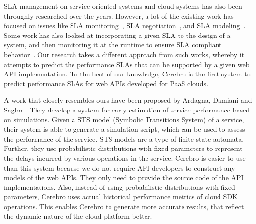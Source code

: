SLA management on service-oriented systems and cloud systems has also been throughly researched
over the years. However, a lot of the existing work has focused on issues like SLA monitoring~\cite{Michlmayr:2009:CQM:1657755.1657756,Tripathy:2011:MMS:1980822.1980832,Raimondi:2008:EOM:1453101.1453125,Bertolino:2007:SUS:1294904.1294914}, SLA negotiation~\cite{Mahbub:2011:PSN:2061042.2062022,Yaqub:2014:ONS:2680847.2681496,6546098}, and SLA modeling~\cite{Chau:2008:ASM:1463788.1463802,Stamou:2013:SGM:2516588.2516592,Skene:2004:PSL:998675.999422}. 
Some work has also looked at incorporating a given SLA to the design of a system, and
then monitoring it at the runtime to ensure SLA compliant behavior~\cite{He:2013:TSC:2532443.2532449}. 
Our research takes a
different approach from such works, whereby it attempts to predict the performance SLAs that can be 
supported by a given web API implementation. To the best of our knowledge, Cerebro is the first system to predict performance SLAs for web APIs developed for PaaS clouds.

A work that closely resembles ours have been proposed by Ardagna, Damiani and Sagbo~\cite{6649675}. They develop
a system for early estimation of service performance based on simulations. Given a STS
model (Symbolic Transitions System) of a service, their system is able to generate a simulation script, which
can be used to assess the performance of the service. STS models are a type of finite state automata. 
Further, they use probabilistic distributions with fixed parameters
to represent the delays incurred by various operations in the service. Cerebro is easier to use than this
system because we do not require API developers to construct any models of the web APIs. They only
need to provide the source code of the API implementations. Also, instead of using probabilistic distributions
with fixed parameters, Cerebro uses actual historical performance metrics of cloud SDK operations. This enables
Cerebro to generate more accurate results, that reflect the dynamic nature of the cloud platform better.